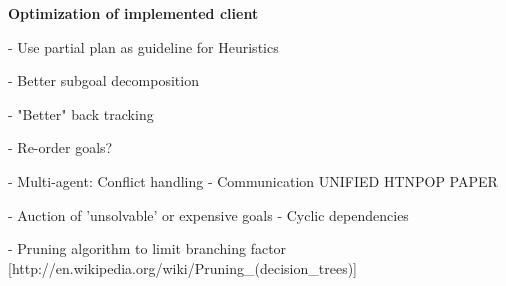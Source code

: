 \documentclass[Main]{subfiles}
\begin{document}
\textbf{Optimization of implemented client}

- Use partial plan as guideline for Heuristics

- Better subgoal decomposition

- "Better" back tracking

- Re-order goals?

- Multi-agent: Conflict handling
- Communication
UNIFIED HTNPOP PAPER

- Auction of 'unsolvable' or expensive goals \cite{VanderKrogt2005}
  - Cyclic dependencies 


- Pruning algorithm to limit branching factor [http://en.wikipedia.org/wiki/Pruning_(decision_trees)]
\end{document}

